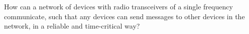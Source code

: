 \medskip
{\addtolength{\leftskip}{10mm}\addtolength{\rightskip}{10mm}\noindent\hrulefill\it

\noindent How can a network of devices with radio transceivers of a single frequency communicate, such that any devices can send messages to other devices in the network, in a reliable and time-critical way?

\noindent\hrulefill

}